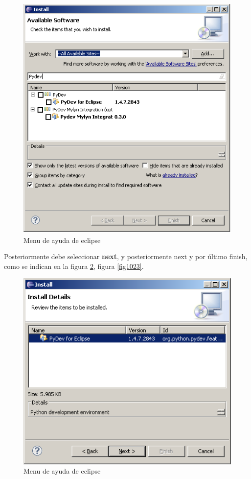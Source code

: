 \documentclass[12pt, twoside]{report}
\begin{document}
\begin{figure}
	\centering
	\includegraphics[width=1.0\linewidth]{Pydev3.png}
	\caption{Menu de ayuda de eclipse}
	\label{fig1021}
\end{figure}

Posteriormente debe seleccionar \textbf{next}, y posteriormente next y por último finish, como se indican en la figura \ref{fig1022}, figura \ref{fig1023}.

\begin{figure}
	\centering
	\includegraphics[width=1.0\linewidth]{Pydev4.png}
	\caption{Menu de ayuda de eclipse}
	\label{fig1022}
\end{figure}
\end{document}
